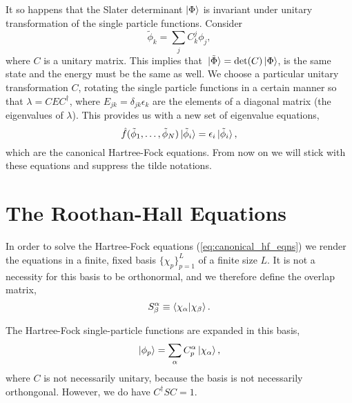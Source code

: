 It so happens that the Slater determinant $\ket{\Phi}$ is invariant under unitary
transformation of the single particle functions. Consider
\begin{equation}
    \tilde{\phi}_k = \sum_j C^j_k\phi_j ,
\end{equation}
where $C$ is a unitary matrix. This implies that $\ket*{\tilde{\Phi}} = \det(C)\ket{\Phi}$,
is the same state and the energy must be the same as well. We choose a particular
unitary transformation $C$, rotating the single particle functions in a certain 
manner so that $\lambda = CEC^\dagger$, where $E_{jk} = \delta_{jk}\epsilon_k$ are the 
elements of a diagonal matrix (the eigenvalues of $\lambda$). This provides us with 
a new set of eigenvalue equations,
\begin{equation}
    \label{eq:canonical_hf_eqns}
    \hat{f}(\tilde{\phi}_1, \dots, \tilde{\phi}_N)\ket*{\tilde{\phi}_i}
        = \epsilon_i \ket*{\tilde{\phi}_i},
\end{equation}
which are the canonical Hartree-Fock equations. From now on we will stick with these 
equations and suppress the tilde notations.

\section{The Roothan-Hall Equations}
\label{sec:roothan_hall_eqns}

In order to solve the Hartree-Fock equations (\autoref{eq:canonical_hf_eqns}) we 
render the equations in a finite, fixed basis $\{\chi_p \}_{p=1}^L$ of a finite 
size $L$. It is not a necessity for this basis to be orthonormal, and we therefore 
define the overlap matrix,
\begin{equation}
    S^\alpha_\beta \equiv \braket{\chi_\alpha}{\chi_\beta}.
\end{equation}

The Hartree-Fock single-particle functions are expanded in this basis,
\begin{equation}
    \label{eq:roothan_hall_exp}
    \ket{\phi_p} = \sum_\alpha C^\alpha_p \ket{\chi_\alpha},
\end{equation}
where $C$ is not necessarily unitary, because the basis is not necessarily 
orthongonal. However, we do have $C^\dagger SC = 1$.

